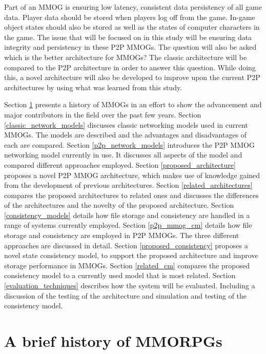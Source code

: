 \documentclass[journal,oneside,a4paper,onecolumn]{IEEEtran}
\begin{document}
Part of an MMOG is ensuring low latency, consistent data persistency of all game data. Player data should be stored when players log off from the game. In-game object states should also be stored as well as the states of computer characters in the game. The issue that will be focused on in this study will be ensuring data integrity and persistency in these P2P MMOGs. The question will also be asked which is the better architecture for MMOGs? The classic architecture will be compared to the P2P architecture in order to answer this question. While doing this, a novel architecture will also be developed to improve upon the current P2P architectures by using what was learned from this study.

Section \ref{mmog_history} presents a history of MMOGs in an effort to show the advancement and major contributors in the field over the past few years.
%
Section \ref{classic_network_models} discusses classic networking models used in current MMOGs. The models are described and the advantages and disadvantages of each are compared.
%
Section \ref{p2p_network_models} introduces the P2P MMOG networking model currently in use. It discusses all aspects of the model and compared different approaches employed.
%
Section \ref{proposed_architecture} proposes a novel P2P MMOG architecture, which makes use of knowledge gained from the development of previous architectures.
%
Section \ref{related_architectures} compares the proposed architectures to related ones and discusses the differences of the architectures and the novelty of the proposed architecture.
%
Section \ref{consistency_models} details how file storage and consistency are handled in a range of systems currently employed.
%
Section \ref{p2p_mmog_cm} details how file storage and consistency are employed in P2P MMOGs. The three different approaches are discussed in detail.
%
Section \ref{proposed_consistency} proposes a novel state consistency model, to support the proposed architecture and improve storage performance in MMOGs.
%
Section \ref{related_cm} compares the proposed consistency model to a currently used model that is most related.
%
Section \ref{evaluation_techniques} describes how the system will be evaluated. Including a discussion of the testing of the architecture and simulation and testing of the consistency model.
%



\section{A brief history of MMORPGs}
\label{mmog_history}
\end{document}
